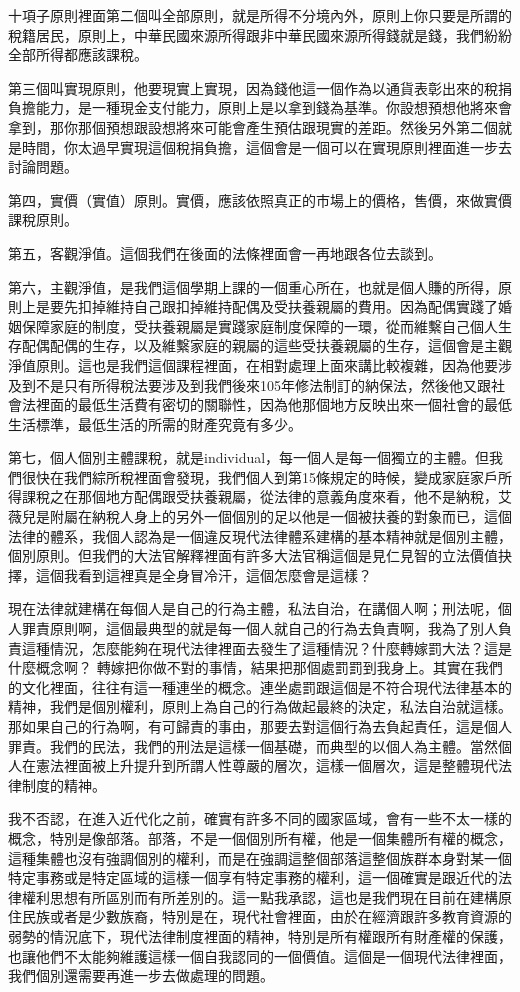 \documentclass[oneside,sub3section]{ctexbook}
\begin{document}
十項子原則裡面第二個叫全部原則，就是所得不分境內外，原則上你只要是所謂的稅籍居民，原則上，中華民國來源所得跟非中華民國來源所得錢就是錢，我們紛紛全部所得都應該課稅。

第三個叫實現原則，他要現實上實現，因為錢他這一個作為以通貨表彰出來的稅捐負擔能力，是一種現金支付能力，原則上是以拿到錢為基準。你設想預想他將來會拿到，那你那個預想跟設想將來可能會產生預估跟現實的差距。然後另外第二個就是時間，你太過早實現這個稅捐負擔，這個會是一個可以在實現原則裡面進一步去討論問題。

第四，實價（實值）原則。實價，應該依照真正的市場上的價格，售價，來做實價課稅原則。

第五，客觀淨值。這個我們在後面的法條裡面會一再地跟各位去談到。

第六，主觀淨值，是我們這個學期上課的一個重心所在，也就是個人賺的所得，原則上是要先扣掉維持自己跟扣掉維持配偶及受扶養親屬的費用。因為配偶實踐了婚姻保障家庭的制度，受扶養親屬是實踐家庭制度保障的一環，從而維繫自己個人生存配偶配偶的生存，以及維繫家庭的親屬的這些受扶養親屬的生存，這個會是主觀淨值原則。這也是我們這個課程裡面，在相對處理上面來講比較複雜，因為他要涉及到不是只有所得稅法要涉及到我們後來105年修法制訂的納保法，然後他又跟社會法裡面的最低生活費有密切的關聯性，因為他那個地方反映出來一個社會的最低生活標準，最低生活的所需的財產究竟有多少。

第七，個人個別主體課稅，就是individual，每一個人是每一個獨立的主體。但我們很快在我們綜所稅裡面會發現，我們個人到第15條規定的時候，變成家庭家戶所得課稅之在那個地方配偶跟受扶養親屬，從法律的意義角度來看，他不是納稅，艾薇兒是附屬在納稅人身上的另外一個個別的足以他是一個被扶養的對象而已，這個法律的體系，我個人認為是一個違反現代法律體系建構的基本精神就是個別主體，個別原則。但我們的大法官解釋裡面有許多大法官稱這個是見仁見智的立法價值抉擇，這個我看到這裡真是全身冒冷汗，這個怎麼會是這樣？

現在法律就建構在每個人是自己的行為主體，私法自治，在講個人啊；刑法呢，個人罪責原則啊，這個最典型的就是每一個人就自己的行為去負責啊，我為了別人負責這種情況，怎麼能夠在現代法律裡面去發生了這種情況？什麼轉嫁罰大法？這是什麼概念啊？ 轉嫁把你做不對的事情，結果把那個處罰罰到我身上。其實在我們的文化裡面，往往有這一種連坐的概念。連坐處罰跟這個是不符合現代法律基本的精神，我們是個別權利，原則上為自己的行為做起最終的決定，私法自治就這樣。那如果自己的行為啊，有可歸責的事由，那要去對這個行為去負起責任，這是個人罪責。我們的民法，我們的刑法是這樣一個基礎，而典型的以個人為主體。當然個人在憲法裡面被上升提升到所謂人性尊嚴的層次，這樣一個層次，這是整體現代法律制度的精神。

我不否認，在進入近代化之前，確實有許多不同的國家區域，會有一些不太一樣的概念，特別是像部落。部落，不是一個個別所有權，他是一個集體所有權的概念，這種集體也沒有強調個別的權利，而是在強調這整個部落這整個族群本身對某一個特定事務或是特定區域的這樣一個享有特定事務的權利，這一個確實是跟近代的法律權利思想有所區別而有所差別的。這一點我承認，這也是我們現在目前在建構原住民族或者是少數族裔，特別是在，現代社會裡面，由於在經濟跟許多教育資源的弱勢的情況底下，現代法律制度裡面的精神，特別是所有權跟所有財產權的保護，也讓他們不太能夠維護這樣一個自我認同的一個價值。這個是一個現代法律裡面，我們個別還需要再進一步去做處理的問題。
\end{document}
